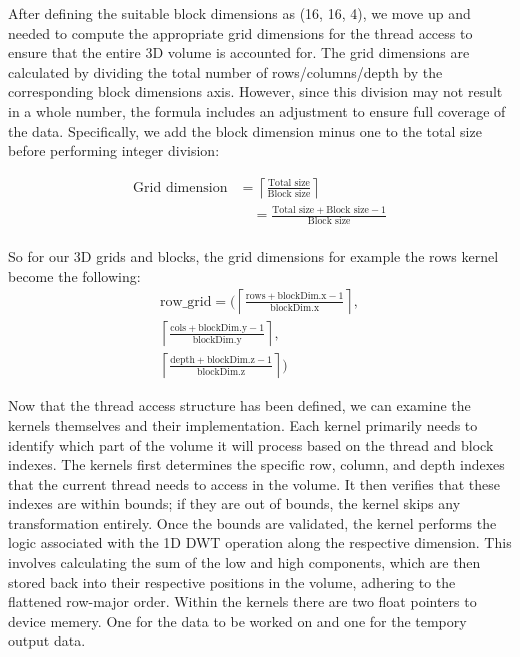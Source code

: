\documentclass[journal,11pt]{IEEEtran}
\begin{document}
After defining the suitable block dimensions as (16, 16, 4), we move up and needed to compute the appropriate grid dimensions for the thread access to ensure that the entire 3D volume is accounted for. The grid dimensions are calculated by dividing the total number of rows/columns/depth by the corresponding block dimensions axis. However, since this division may not result in a whole number, the formula includes an adjustment to ensure full coverage of the data. Specifically, we add the block dimension minus one to the total size before performing integer division:

\begin{equation}
    \begin{aligned}
        \text{Grid dimension} &= \left\lceil \frac{\text{Total size}}{\text{Block size}} \right\rceil \\
        &\quad = \frac{\text{Total size} + \text{Block size} - 1}{\text{Block size}}
    \end{aligned}
\end{equation}
\\

So for our 3D grids and blocks, the grid dimensions for example the rows kernel become the following:
\begin{equation}
    \begin{aligned}
        \text{row\_grid} = \Bigg( 
        \left\lceil \frac{\text{rows} + \text{blockDim.x} - 1}{\text{blockDim.x}} \right\rceil, \\
        \left\lceil \frac{\text{cols} + \text{blockDim.y} - 1}{\text{blockDim.y}} \right\rceil, \\
        \left\lceil \frac{\text{depth} + \text{blockDim.z} - 1}{\text{blockDim.z}} \right\rceil
        \Bigg)
    \end{aligned}
\end{equation}

Now that the thread access structure has been defined, we can examine the kernels themselves and their implementation. Each kernel primarily needs to identify which part of the volume it will process based on the thread and block indexes. The kernels first determines the specific row, column, and depth indexes that the current thread needs to access in the volume. It then verifies that these indexes are within bounds; if they are out of bounds, the kernel skips any transformation entirely. Once the bounds are validated, the kernel performs the logic associated with the 1D DWT operation along the respective dimension. This involves calculating the sum of the low and high components, which are then stored back into their respective positions in the volume, adhering to the flattened row-major order. Within the kernels there are two float pointers to device memery. One for the data to be worked on and one for the tempory output data. 
\end{document}
